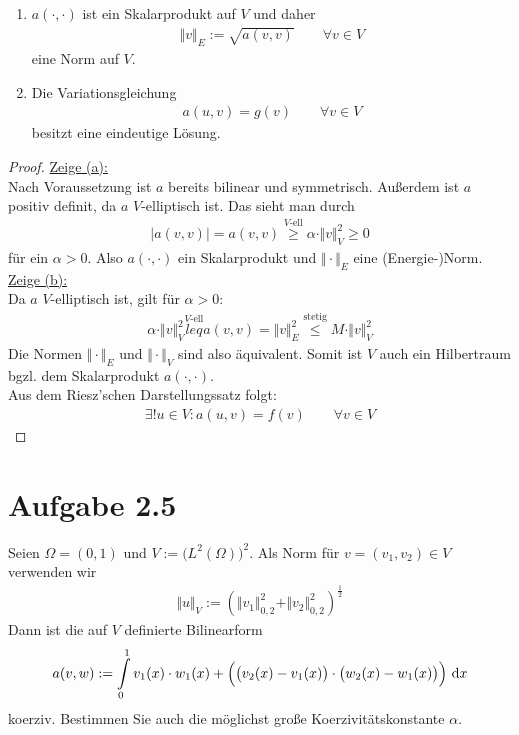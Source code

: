 \documentclass[12pt,a4paper]{article}
\begin{document}
\begin{enumerate}[label=(\alph*)]
\item $a(\cdot,\cdot)$ ist ein Skalarprodukt auf $V$ und daher
\begin{align*}
\Vert v\Vert_E:=\sqrt{a(v,v)}\qquad\forall v\in V
\end{align*}
eine Norm auf $V$.
\item Die Variationsgleichung
\begin{align*}
a(u,v)=g(v)\qquad\forall v\in V
\end{align*}
besitzt eine eindeutige Lösung.
\end{enumerate}
\begin{proof}
\underline{Zeige (a):}\\
Nach Voraussetzung ist $a$ bereits bilinear und symmetrisch. Außerdem ist $a$ positiv definit, da $a$ $V$-elliptisch ist. Das sieht man durch
\begin{align*}
|a(v,v)|=a(v,v)\stackrel{V\text{-ell}}{\geq}
\alpha\cdot\Vert v\Vert^2_V\geq0
\end{align*}
für ein $\alpha>0$. Also $a(\cdot,\cdot)$ ein Skalarprodukt und $\Vert\cdot\Vert_E$ eine (Energie-)Norm.\\

\underline{Zeige (b):}\\
Da $a$ $V$-elliptisch ist, gilt für $\alpha>0$:
\begin{align*}
\alpha\cdot\Vert v\Vert_V^2
\stackrel{V\text{-ell}}{leq}
a(v,v)=\Vert v\Vert_E^2
\stackrel{\text{stetig}}{\leq}
M\cdot\Vert v\Vert_V^2
\end{align*}
Die Normen $\Vert\cdot\Vert_E$ und $\Vert\cdot\Vert_V$ sind also äquivalent. Somit ist $V$ auch ein Hilbertraum bgzl. dem Skalarprodukt $a(\cdot,\cdot)$.\\

Aus dem Riesz'schen Darstellungssatz folgt:
\begin{align*}
\exists! u\in V:a(u,v)=f(v)\qquad\forall v\in V
\end{align*}
\end{proof}

\section*{Aufgabe 2.5}
Seien $\Omega=(0,1)$ und $V:=\big(L^2(\Omega)\big)^2$. Als Norm für $v=(v_1,v_2)\in V$ verwenden wir
\begin{align*}
\Vert u\Vert_V:=\left(\Vert v_1\Vert_{0,2}^2+\Vert v_2\Vert^2_{0,2}\right)^{\frac{1}{2}}
\end{align*}
Dann ist die auf $V$ definierte Bilinearform
\begin{align*}
a(v,w):=\int\limits_0^1 v_1(x)\cdot w_1(x)+\Big(\big(v_2(x)-v_1(x)\big)\cdot\big(w_2(x)-w_1(x)\big)\Big)\text{ d} x
\end{align*}
koerziv. Bestimmen Sie auch die möglichst große Koerzivitätskonstante $\alpha$.
\end{document}
